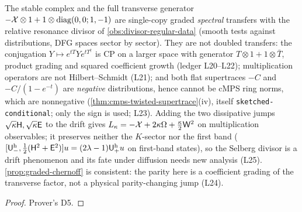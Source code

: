 \begin{proposition}
\label{prop:selberg-no-cp-realisation}
The stable complex and the full transverse generator $-\mathcal X\otimes1+1\otimes\operatorname{diag}(0,0;1,-1)$
are single-copy graded \emph{spectral} transfers with the relative resonance divisor of
\cref{obs:divisor-regular-data} (smooth tests against distributions, DFG spaces sector by sector).
They are not doubled transfers: the conjugation $Y\mapsto e^{tT}Ye^{tT^\dagger}$ is CP on a larger
space with generator $T\otimes1+1\otimes\bar T$, product grading and squared coefficient growth
(ledger L20--L22); multiplication operators are not Hilbert--Schmidt (L21); and both flat
supertraces $-C$ and $-C/(1-e^{-t})$ are \emph{negative} distributions, hence cannot be cMPS ring
norms, which are nonnegative (\cref{thm:cmps-twisted-supertrace}(iv), itself \texttt{sketched-conditional};
only the sign is used; L23). Adding the two
dissipative jumps $\sqrt\kappa\mathsf H,\sqrt\kappa\mathsf E$ to the drift gives $L_\kappa = -\mathcal X+
2\kappa\Omega+\tfrac\kappa2\mathsf W^2$ on multiplication observables; it preserves neither the $K$-sector
nor the first band ($[{\mathsf U^{\mathrm h}_{-}},\tfrac12(\mathsf H^2+\mathsf E^2)]u = (2\lambda-1){\mathsf U^{\mathrm h}_{+}}u$ on first-band
states), so the Selberg divisor is a drift phenomenon and its fate under diffusion needs new
analysis (L25). \cref{prop:graded-chernoff} is consistent: the parity here is a coefficient
grading of the transverse factor, not a physical parity-changing jump (L24).
\end{proposition}
\begin{proof}
Prover's D5.
\end{proof}

